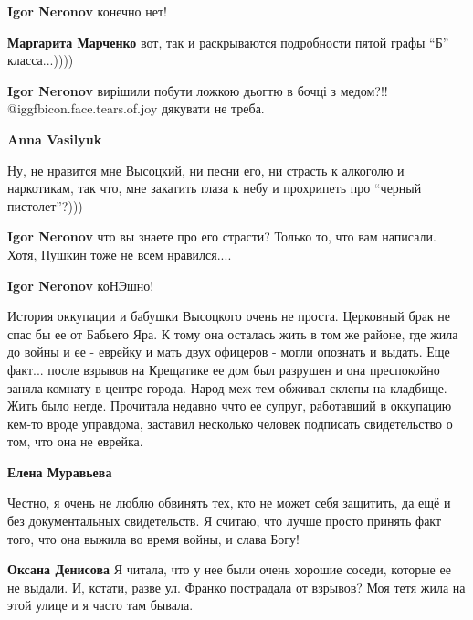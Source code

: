 \begin{itemize}
\begin{itemize}
\textbf{Igor Neronov} конечно нет!

\begin{itemize} %
\textbf{Маргарита Марченко} вот, так и раскрываются подробности пятой графы \enquote{Б} класса...))))

\textbf{Igor Neronov} вирішили побути ложкою дьогтю в бочці з медом?!! @igg{fbicon.face.tears.of.joy} дякувати не треба.

\textbf{Anna Vasilyuk} 

Ну, не нравится мне Высоцкий, ни песни его, ни страсть к алкоголю и наркотикам,
так что, мне закатить глаза к небу и прохрипеть про \enquote{черный пистолет}?)))

\textbf{Igor Neronov} что вы знаете про его страсти? Только то, что вам написали. Хотя, Пушкин тоже не всем нравился....

\textbf{Igor Neronov} коНЭшно!
\end{itemize} %

\end{itemize} %


История оккупации и бабушки Высоцкого очень не проста. Церковный брак не спас
бы ее от Бабьего Яра. К тому она осталась жить в том же районе, где жила до
войны и ее - еврейку и мать двух офицеров - могли опознать и выдать. Еще
факт... после взрывов на Крещатике ее дом был разрушен и она преспокойно заняла
комнату в центре города. Народ меж тем обживал склепы на кладбище. Жить было
негде. Прочитала недавно ччто ее супруг, работавший в оккупацию кем-то вроде
управдома, заставил несколько человек подписать свидетельство о том, что она не
еврейка.

\begin{itemize} %
\textbf{Елена Муравьева} 

Честно, я очень не люблю обвинять тех, кто не может себя защитить, да ещё и без
документальных свидетельств. Я считаю, что лучше просто принять факт того, что
она выжила во время войны, и слава Богу!

\begin{itemize} %
\textbf{Оксана Денисова} Я читала, что у нее были очень хорошие соседи, которые ее не выдали. И, кстати, разве ул. Франко пострадала от взрывов? Моя тетя жила на этой улице и я часто там бывала.


\end{itemize}
\end{itemize}
\end{itemize}
